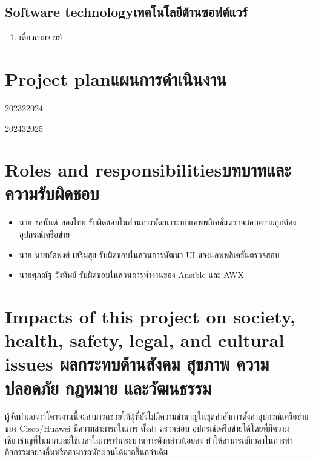 \subsection{\ifenglish Software technology\else เทคโนโลยีด้านซอฟต์แวร์\fi}
\begin{enumerate}
    \item {เดี๋ยวถามจารย์}
\end{enumerate}
\section{\ifenglish Project plan\else แผนการดำเนินงาน\fi}

\begin{plan}{11}{2023}{2}{2024}
\end{plan}

\begin{plan}{11}{2024}{3}{2025}
\end{plan}

\section{\ifenglish Roles and responsibilities\else บทบาทและความรับผิดชอบ\fi}
\begin{itemize}
    \item นาย ชลนันต์ ทองไทย รับผิดชอบในส่วนการพัฒนาระบบแอพพลิเคชั่นตรวจสอบความถูกต้องอุปกรณ์เครือข่าย
    \item นาย นายทัตพงศ์ เสริมสุข รับผิดชอบในส่วนการพัฒนา UI ของแอพพลิเคชั่นตรวจสอบ
    \item นายศุภณัฐ วังทิพย์ รับผิดชอบในส่วนการทำงานของ Ansible และ AWX
\end{itemize}

\section{\ifenglish%
Impacts of this project on society, health, safety, legal, and cultural issues
\else%
ผลกระทบด้านสังคม สุขภาพ ความปลอดภัย กฎหมาย และวัฒนธรรม
\fi}

\hspace{0.5in}
ผู้จัดทำมองว่าโครงงานนี้จะสามารถช่วยให้ผู้ที่ยังไม่มีความชำนาญในชุดคำสั่งการตั้งค่าอุปกรณ์เครือข่ายของ Cisco/Huawei มีความสามารถในการ ตั้งค่า ตรวจสอบ อุปกรณ์เครือข่ายได้โดยที่มีความเชี่ยวชาญที่ไม่มากและใช้เวลาในการทำกระบวนการดังกล่าวน้อยลง ทำให้สามารถมีเวลาในการทำกิจกรรมอย่างอื่นหรือสามารถพักผ่อนได้มากขึ้นกว่าเดิม
